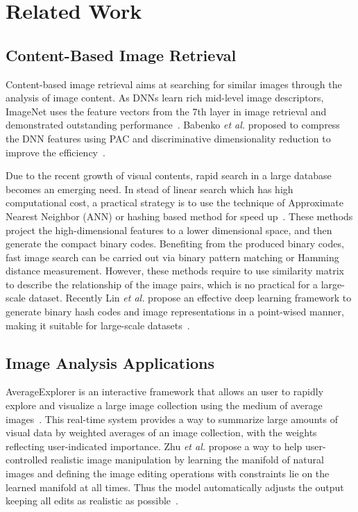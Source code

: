 \section{Related Work}
\subsection{Content-Based Image Retrieval}
Content-based image retrieval aims at searching for similar images
through the analysis of image content. As DNNs learn rich mid-level
image descriptors, ImageNet uses the feature vectors from the 7th
layer in image retrieval and demonstrated outstanding
performance~\cite{krizhevsky2012imagenet}. Babenko \textit{et al.}
proposed to compress the DNN features using PAC and discriminative
dimensionality reduction to improve the efficiency~\cite{babenko2014neural}.

Due to the recent growth of visual contents, rapid search in a large
database becomes an emerging need. In stead of linear search which has
high computational cost, a practical strategy is to use the technique
of Approximate Nearest Neighbor (ANN) or hashing based method for
speed up~\cite{gionis1999similarity,weiss2009spectral,kulis2009learning,
norouzi2011minimal,liu2012supervised,xia2014supervised}. These methods
project the high-dimensional features to a lower dimensional space, and
then generate the compact binary codes. Benefiting from the produced
binary codes, fast image search can be carried out via binary pattern
matching or Hamming distance measurement. However, these methods require
to use similarity matrix to describe the relationship of the image pairs, which
is no practical for a large-scale dataset. Recently Lin \textit{et al.}
propose an effective deep learning framework to generate binary hash codes
and image representations in a point-wised manner, making it suitable
for large-scale datasets~\cite{lin2015deep}.

\subsection{Image Analysis Applications}
AverageExplorer is an interactive framework that allows an user to rapidly
explore and visualize a large image collection using the medium of average
images~\cite{zhu2014averageexplorer}. This real-time system provides a
way to summarize large amounts of visual data by weighted averages of
an image collection, with the weights reflecting user-indicated importance.
Zhu \textit{et al.} propose a way to help user-controlled realistic image
manipulation by learning the manifold of natural images and defining the
image editing operations with constraints lie on the learned manifold at
all times. Thus the model automatically adjusts the output keeping all edits
as realistic as possible~\cite{zhu2016generative}.

